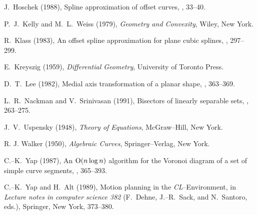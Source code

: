 \begin{thebibliography}{99}
J.~Hoschek (1988), Spline approximation of offset curves, ,
33--40.

P.~J.~Kelly and M.~L.~Weiss (1979), {\it Geometry and Convexity}, Wiley,
New York.

R.~Klass (1983), An offset spline approximation for plane cubic splines,
, 297--299.

E.~Kreyszig (1959), {\it Differential Geometry}, University of Toronto
Press.

D.~T.~Lee (1982), Medial axis transformation of a planar shape,
, 363--369.

L.~R.~Nackman and V.~Srinivasan (1991), Bisectors of linearly separable
sets, , 263--275.







J.~V.~Uspensky (1948), {\it Theory of Equations}, McGraw--Hill,
New York.

R. J. Walker (1950), {\it Algebraic Curves}, Springer--Verlag, New York.

C.--K.~Yap (1987), An ${\rm O}(n\log n)$ algorithm for the Voronoi
diagram of a set of simple curve segments, , 365--393.

C.--K.~Yap and H.~Alt (1989), Motion planning in the {\it
CL\/}--Environment, in {\it Lecture notes in computer science 382\/}
(F.~Dehne, J.--R.~Sack, and N.~Santoro, eds.), Springer, New York,
373--380.

\end{thebibliography}



